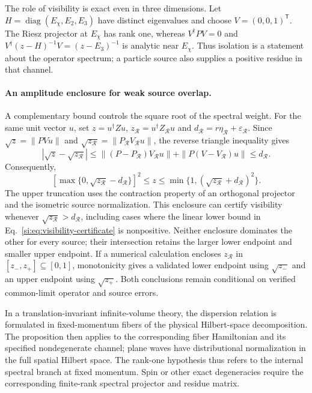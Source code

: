 \documentclass[11pt,a4paper]{article}
\begin{document}
The role of visibility is exact even in three dimensions. Let $H=\operatorname{diag}(E_\chi,E_2,E_3)$ have distinct eigenvalues and choose $V=(0,0,1)^{\mathsf T}$. The Riesz projector at $E_\chi$ has rank one, whereas $V^\dagger P V=0$ and $V^\dagger(z-H)^{-1}V=(z-E_3)^{-1}$ is analytic near $E_\chi$. Thus isolation is a statement about the operator spectrum; a particle source also supplies a positive residue in that channel.

\paragraph{An amplitude enclosure for weak source overlap.}
A complementary bound controls the square root of the spectral weight. For the same unit vector $u$, set $z=u^\dagger Zu$, $z_{\mathcal R}=u^\dagger Z_{\mathcal R}u$ and $d_{\mathcal R}=r\eta_{\mathcal R}+\varepsilon_{\mathcal R}$. Since $\sqrt z=\|PVu\|$ and $\sqrt{z_{\mathcal R}}=\|P_{\mathcal R}V_{\mathcal R}u\|$, the reverse triangle inequality gives
\[
\left|\sqrt z-\sqrt{z_{\mathcal R}}\right|
\leq\|(P-P_{\mathcal R})V_{\mathcal R}u\|
+\|P(V-V_{\mathcal R})u\|\leq d_{\mathcal R}.
\]
Consequently,
\begin{equation}\label{si:eq:amplitude-residue}
\boxed{\left[\max\{0,\sqrt{z_{\mathcal R}}-d_{\mathcal R}\}\right]^2
\leq z\leq
\min\{1,(\sqrt{z_{\mathcal R}}+d_{\mathcal R})^2\}.}
\end{equation}
The upper truncation uses the contraction property of an orthogonal projector and the isometric source normalization. This enclosure can certify visibility whenever $\sqrt{z_{\mathcal R}}>d_{\mathcal R}$, including cases where the linear lower bound in Eq.~\eqref{si:eq:visibility-certificate} is nonpositive. Neither enclosure dominates the other for every source; their intersection retains the larger lower endpoint and smaller upper endpoint. If a numerical calculation encloses $z_{\mathcal R}$ in $[z_-,z_+]\subseteq[0,1]$, monotonicity gives a validated lower endpoint using $\sqrt{z_-}$ and an upper endpoint using $\sqrt{z_+}$. Both conclusions remain conditional on verified common-limit operator and source errors.

In a translation-invariant infinite-volume theory, the dispersion relation is formulated in fixed-momentum fibers of the physical Hilbert-space decomposition. The proposition then applies to the corresponding fiber Hamiltonian and its specified nondegenerate channel; plane waves have distributional normalization in the full spatial Hilbert space. The rank-one hypothesis thus refers to the internal spectral branch at fixed momentum. Spin or other exact degeneracies require the corresponding finite-rank spectral projector and residue matrix.
\end{document}
